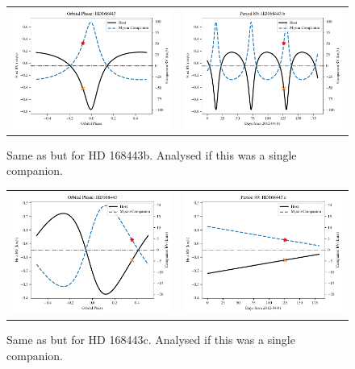 \begin{figure}
    \centering
    \begin{tabular}{cc}
        \includegraphics[width=0.45\linewidth]{figures/direct-recovery/orbital-plots/HD168443b_orbital_phase.pdf}&
        \includegraphics[width=0.45\linewidth]{figures/direct-recovery/orbital-plots/HD168443b_p89.pdf}\\
    \end{tabular}
    \caption{Same as  but for HD 168443b.  Analysed if this was a single companion.}
    \label{fig:hd168443bp89}
\end{figure}


\begin{figure}
    \centering
    \begin{tabular}{cc}
        \includegraphics[width=0.45\linewidth]{figures/direct-recovery/orbital-plots/HD168443c_orbital_phase.pdf}&
        \includegraphics[width=0.45\linewidth]{figures/direct-recovery/orbital-plots/HD168443c_p89.pdf}\\
    \end{tabular}
    \caption{Same as  but for HD 168443c.  Analysed if this was a single companion.}
    \label{fig:hd168443cp89}
\end{figure}

